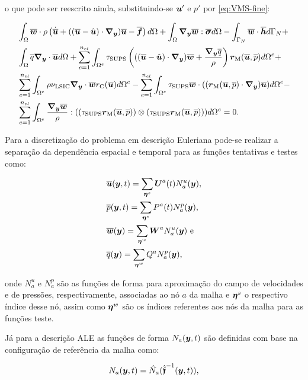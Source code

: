 \noindent o que pode ser reescrito ainda, substituindo-se $\boldsymbol{u}'$ e $p'$ por \eqref{eq:VMS-fine}:

\begin{equation}
    \begin{split}
        &\intDom{\BBB{w}\cdot\rho\bigpar{\dot{\BBB{u}}+((\BBB{u}-\HBB{u})\cdot\Ny)\BBB{u}-\BBB{f}}}+\intDom{\Ny\BBB{w}:\bar{\tens}}-\intNeumann{\BBB{w}\cdot\BBB{h}}+\\
        &\intDom{\bar{q}\Ny\cdot\BBB{u}}+\SintDom{\tau_\sups\bigpar{((\BBB{u}-\HBB{u})\cdot\Ny)\BBB{w}+\frac{\Ny\bar{q}}{\rho}}\rM}+\\
        &\SintDom{\rho\nu_\lsic\Ny\cdot\BBB{w}\rC}-\SintDom{\tau_\sups\BBB{w}\cdot((\rM\cdot\Ny)\BBB{u})}-\\
        &\SintDom{\frac{\Ny\BBB{w}}{\rho}:((\tau_\sups\rM)\otimes(\tau_\sups\rM))}=0
        \text{.}
        \label{eq:RBVMS1}
    \end{split}
\end{equation}

Para a discretização do problema em descrição Euleriana pode-se realizar a separação da dependência espacial e temporal para as funções tentativas e testes como:

\begin{subequations}
    \begin{align}
         & \overline{\boldsymbol{u}}(\boldsymbol{y},t)=\sum_{\boldsymbol{\eta}^s}{\boldsymbol{U}^a(t)N_a^u(\boldsymbol{y})}\text{,}\label{eq:uh} \\
         & \overline{p}(\boldsymbol{y},t)=\sum_{\boldsymbol{\eta}^s}{P^a(t)N_a^p(\boldsymbol{y})}\text{,}                   \\
         & \overline{\boldsymbol{w}}(\boldsymbol{y})=\sum_{\boldsymbol{\eta}^w}{\boldsymbol{W}^aN_a^u(\boldsymbol{y})}\text{ e}\label{eq:w-sep}  \\
         & \overline{q}(\boldsymbol{y})=\sum_{\boldsymbol{\eta}^w}{Q^aN_a^p(\boldsymbol{y})}\text{,}\label{eq:q-sep}
    \end{align}
\end{subequations}

\noindent onde $N_a^u$ e $N_a^p$ são as funções de forma para aproximação do campo de velocidades e de pressões, respectivamente, associadas ao nó $a$ da malha e $\boldsymbol{\eta}^s$ o respectivo índice desse nó, assim como $\boldsymbol{\eta}^w$ são os índices referentes aos nós da malha para as funções teste.

Já para a descrição ALE as funções de forma $N_a(\boldsymbol{y},t)$ são definidas com base na configuração de referência da malha como:

\begin{equation}
    N_a(\boldsymbol{y},t)=\hat{N}_a(\hat{\boldsymbol{\mathfrak{f}}}^{-1}(\boldsymbol{y},t))\text{,}
\end{equation}

